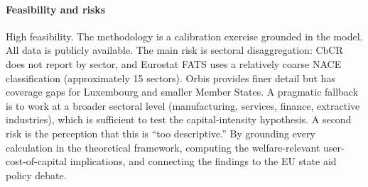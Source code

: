 \documentclass[11pt,a4paper]{article}
\begin{document}
\paragraph{Feasibility and risks} High feasibility. The methodology is a calibration exercise grounded in the \citeauthor{schjelderup2024} model. All data is publicly available. The main risk is sectoral disaggregation: CbCR does not report by sector, and Eurostat FATS uses a relatively coarse NACE classification (approximately 15 sectors). Orbis provides finer detail but has coverage gaps for Luxembourg and smaller Member States. A pragmatic fallback is to work at a broader sectoral level (manufacturing, services, finance, extractive industries), which is sufficient to test the capital-intensity hypothesis. A second risk is the perception that this is ``too descriptive.'' By grounding every calculation in the \citeauthor{schjelderup2024} theoretical framework, computing the welfare-relevant user-cost-of-capital implications, and connecting the findings to the EU state aid policy debate. 

\newpage
\printbibliography
\end{document}
